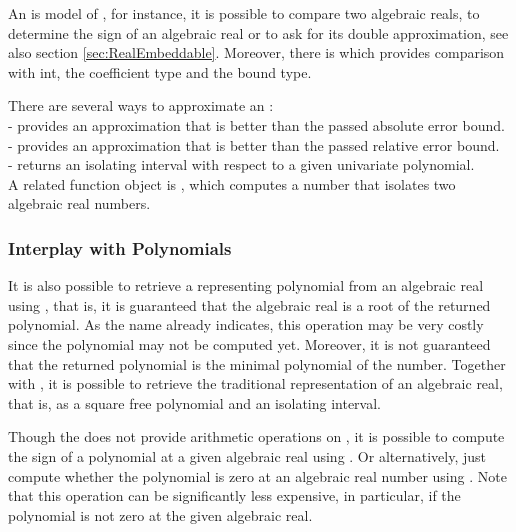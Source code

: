 An  is model of
, for instance, it is possible to compare two
algebraic reals, to determine the sign of an algebraic real or to ask
for its double approximation, see also section \ref{sec:RealEmbeddable}.
Moreover, there is  which provides
comparison with int, the coefficient type and the bound type.

There are several ways to approximate an :\\
 - provides an approximation that is 
better than the passed absolute error bound. \\
 - provides an approximation that is 
better than the passed relative error bound. \\
 - returns an isolating interval with respect to 
a given univariate polynomial. \\
A related function object is , which computes 
a number that isolates two algebraic real numbers. 



\subsubsection{Interplay with Polynomials}
It is also possible to retrieve a representing polynomial from an
algebraic real using , that
is, it is guaranteed that the algebraic real is a root of the returned
polynomial. As the name already indicates, this operation may be very
costly since the polynomial may not be computed yet. Moreover, it is
not guaranteed that the returned polynomial is the minimal polynomial
of the number.  Together with , it
is possible to retrieve the traditional representation of an algebraic
real, that is, as a square free polynomial and an isolating interval.

Though the  does not provide arithmetic
operations on , it is
possible to compute the sign of a polynomial at a given algebraic
real using .  Or alternatively,
just compute whether the polynomial is zero at an algebraic real number
using .  Note that this operation
can be significantly less expensive, in particular, if the polynomial
is not zero at the given algebraic real.


